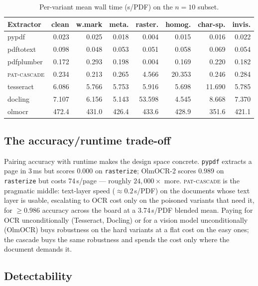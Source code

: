 \documentclass[11pt]{article}
\newcommand{\variant}[1]{\texttt{#1}}
\begin{document}
\begin{table}[tbp]
\centering
\caption{Per-variant mean wall time (s/PDF) on the $n=10$ subset.}
\label{tab:runtimevariant}
\footnotesize
\setlength{\tabcolsep}{5pt}
\begin{tabular}{@{}l rrrrrrr@{}}
\toprule
\textbf{Extractor} & clean & w.mark & meta. & raster. &
  homog. & char-sp. & invis.\\
\midrule
pypdf       & 0.023 & 0.025 & 0.018 & 0.004 & 0.015 & 0.016 & 0.022\\
pdftotext   & 0.098 & 0.048 & 0.053 & 0.051 & 0.058 & 0.069 & 0.054\\
pdfplumber  & 0.172 & 0.293 & 0.198 & 0.004 & 0.169 & 0.220 & 0.182\\
\rowcolor{patrow}
\textsc{pat-cascade} & 0.234 & 0.213 & 0.265 & 4.566 & 20.353 & 0.246
  & 0.284\\
tesseract   & 6.086 & 5.766 & 5.753 & 5.916 & 5.698 & 11.690 & 5.785\\
docling     & 7.107 & 6.156 & 5.143 & 53.598 & 4.545 & 8.668 & 7.370\\
olmocr      & 472.4 & 431.0 & 426.4 & 433.6 & 428.9 & 351.6 & 421.1\\
\bottomrule
\end{tabular}
\end{table}

\subsection{The accuracy/runtime trade-off}
\label{sec:tradeoff}

Pairing accuracy with runtime makes the design space concrete.
\texttt{pypdf} extracts a page in 3\,ms but scores $0.000$ on
\variant{rasterize}; OlmOCR-2 scores $0.989$ on \variant{rasterize} but
costs 74\,s/page --- roughly $24{,}000\times$ more. \textsc{pat-cascade}
is the pragmatic middle: text-layer speed ($\approx 0.2$\,s/PDF) on the
documents whose text layer is usable, escalating to OCR cost only on the
poisoned variants that need it, for $\geq 0.986$ accuracy across the
board at a 3.74\,s/PDF blended mean. Paying for OCR unconditionally
(Tesseract, Docling) or for a vision model unconditionally (OlmOCR) buys
robustness on the hard variants at a flat cost on the easy ones; the
cascade buys the same robustness and spends the cost only where the
document demands it.

\subsection{Detectability}
\label{sec:detect}
\end{document}
